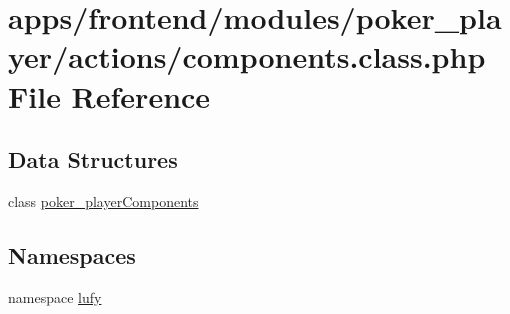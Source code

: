 \hypertarget{frontend_2modules_2poker__player_2actions_2components_8class_8php}{\section{apps/frontend/modules/poker\-\_\-player/actions/components.class.\-php File Reference}
\label{frontend_2modules_2poker__player_2actions_2components_8class_8php}
}
\subsection*{Data Structures}
\begin{DoxyCompactItemize}
\item 
class \hyperlink{classpoker__player_components}{poker\-\_\-player\-Components}
\end{DoxyCompactItemize}
\subsection*{Namespaces}
\begin{DoxyCompactItemize}
\item 
namespace \hyperlink{namespacelufy}{lufy}
\end{DoxyCompactItemize}

